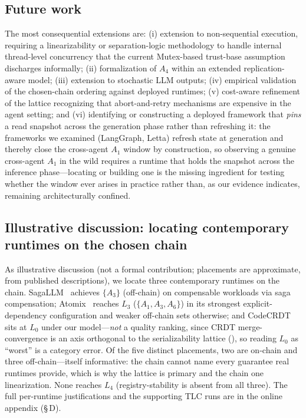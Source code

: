 \documentclass[journal,compsoc,10pt]{IEEEtran}
\providecommand{\citep}{\cite}
\theoremstyle{definition}
\theoremstyle{remark}
\begin{document}
\subsection{Future work}
\label{sec:future-work}
The most consequential extensions are: (i) extension to
non-sequential execution, requiring a linearizability or
separation-logic methodology to handle internal thread-level
concurrency that the current Mutex-based trust-base assumption
discharges informally;
(ii) formalization of $A_4$ within an
extended replication-aware model; (iii) extension to stochastic LLM
outputs; (iv) empirical validation of the chosen-chain ordering against
deployed runtimes; (v) cost-aware refinement of the lattice
recognizing that abort-and-retry mechanisms are expensive in the
agent setting; and (vi) identifying or constructing a deployed framework
that \emph{pins} a read snapshot across the generation phase rather than
refreshing it: the frameworks we examined (LangGraph, Letta) refresh state
at generation and thereby close the cross-agent $A_1$ window by
construction, so observing a genuine cross-agent $A_1$ in the wild requires
a runtime that holds the snapshot across the inference phase---locating or
building one is the missing ingredient for testing whether the window ever
arises in practice rather than, as our evidence indicates, remaining
architecturally confined.

\subsection{Illustrative discussion: locating contemporary runtimes on the chosen chain}
\label{sec:deployed-mappings}
As illustrative discussion (not a formal contribution; placements are
approximate, from published descriptions), we locate three contemporary
runtimes on the chain. SagaLLM~\citep{GengChang2025SagaLLM} achieves
$\{A_3\}$ (off-chain) on compensable workloads via saga compensation;
Atomix~\citep{MohammadiEtAl2026Atomix} reaches $L_3$ ($\{A_1,A_3,A_6\}$) in
its strongest explicit-dependency configuration and weaker off-chain sets
otherwise; and CodeCRDT~\citep{Pugachev2025CodeCRDT} sits at $L_0$ under our
model---\emph{not} a quality ranking, since CRDT merge-convergence is an
axis orthogonal to the serializability lattice (),
so reading $L_0$ as ``worst'' is a category error. Of the five distinct
placements, two are on-chain and three off-chain---itself informative: the
chain cannot name every guarantee real runtimes provide, which is why the
lattice is primary and the chain one linearization. None reaches $L_4$
(registry-stability is absent from all three). The full per-runtime
justifications and the supporting TLC runs are in the online appendix
(\S\,D).
\end{document}
